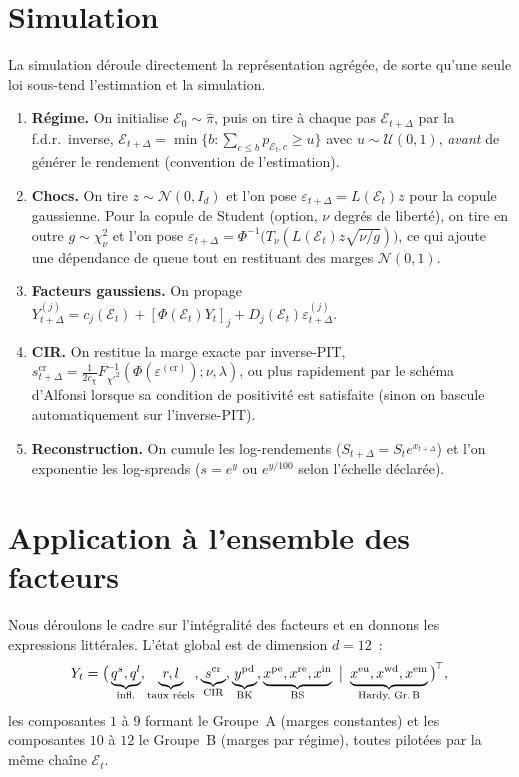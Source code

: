 \documentclass[11pt,a4paper]{article}
\theoremstyle{definition}
\newcommand{\Ecal}{\mathcal{E}}
\newcommand{\Ncal}{\mathcal{N}}
\newcommand{\eps}{\varepsilon}
\newcommand{\transp}{^{\!\top}}
\newcommand{\Dt}{\Delta}
\begin{document}
\section{Simulation}
\label{sec:simu}
La simulation déroule directement la représentation agrégée, de sorte qu'une seule loi sous-tend l'estimation et la simulation.
\begin{algobox}[Simulation d'une trajectoire ($t=0,\Dt,\dots,T$)]
\begin{enumerate}[leftmargin=1.4em,nosep]
\item \textbf{Régime.} On initialise $\Ecal_0\sim\hat\pi$, puis on tire à chaque pas $\Ecal_{t+\Dt}$ par la f.d.r.\ inverse, $\Ecal_{t+\Dt}=\min\{b:\sum_{c\le b}p_{\Ecal_t,c}\ge u\}$ avec $u\sim\mathcal U(0,1)$, \emph{avant} de générer le rendement (convention de l'estimation).
\item \textbf{Chocs.} On tire $z\sim\Ncal(0,I_d)$ et l'on pose $\eps_{t+\Dt}=L(\Ecal_t)z$ pour la copule gaussienne. Pour la copule de Student (option, $\nu$ degrés de liberté), on tire en outre $g\sim\chi^2_\nu$ et l'on pose $\eps_{t+\Dt}=\Phi^{-1}\big(T_\nu(L(\Ecal_t)z\sqrt{\nu/g})\big)$, ce qui ajoute une dépendance de queue tout en restituant des marges $\Ncal(0,1)$.
\item \textbf{Facteurs gaussiens.} On propage $Y^{(j)}_{t+\Dt}=c_j(\Ecal_t)+[\Phi(\Ecal_t)Y_t]_j+D_j(\Ecal_t)\eps^{(j)}_{t+\Dt}$.
\item \textbf{CIR.} On restitue la marge exacte par inverse-PIT, $s^{\mathrm{cr}}_{t+\Dt}=\tfrac{1}{2c_\chi}F^{-1}_{\chi'^2}(\Phi(\eps^{(\mathrm{cr})});\nu,\lambda)$, ou plus rapidement par le schéma d'Alfonsi lorsque sa condition de positivité est satisfaite (sinon on bascule automatiquement sur l'inverse-PIT).
\item \textbf{Reconstruction.} On cumule les log-rendements ($S_{t+\Dt}=S_te^{x_{t+\Dt}}$) et l'on exponentie les log-spreads ($s=e^{y}$ ou $e^{y/100}$ selon l'échelle déclarée).
\end{enumerate}
\end{algobox}

\section{Application à l'ensemble des facteurs}
\label{sec:appli}
Nous déroulons le cadre sur l'intégralité des facteurs et en donnons les expressions littérales. L'état global est de dimension $d=12$~:
\[
Y_t=\big(\underbrace{q^s,q^l}_{\text{infl.}},\underbrace{r,l}_{\text{taux réels}},\underbrace{s^{\mathrm{cr}}}_{\text{CIR}},\underbrace{y^{\mathrm{pd}}}_{\text{BK}},\underbrace{x^{\mathrm{pe}},x^{\mathrm{re}},x^{\mathrm{in}}}_{\text{BS}}\ \big|\ \underbrace{x^{\mathrm{eu}},x^{\mathrm{wd}},x^{\mathrm{em}}}_{\text{Hardy, Gr.\,B}}\big)\transp,
\]
les composantes $1$ à $9$ formant le Groupe~A (marges constantes) et les composantes $10$ à $12$ le Groupe~B (marges par régime), toutes pilotées par la même chaîne $\Ecal_t$.
\end{document}
